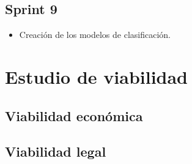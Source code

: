 \subsection{Sprint 9}

\begin{itemize}
\item Creación de los modelos de clasificación.
\end{itemize}

\section{Estudio de viabilidad}

\subsection{Viabilidad económica}

\subsection{Viabilidad legal}


